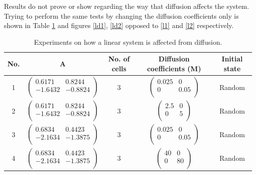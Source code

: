Results do not prove or show regarding the way that diffusion affects the system. Trying to perform the same tests by changing the diffusion coefficients only is shown in Table \ref{diffLexp} and figures \ref{ld1}, \ref{ld2} opposed to \ref{l1} and \ref{l2} respectively. 

\begin{table}
\caption{Experiments on how a linear system is affected from diffusion.}
\label{diffLexp} 
\begin{center}
\begin{tabular}{| c | c | c | c | c |}
\hline
No. & A & No. of cells & {Diffusion coefficients (M)} & Initial state\\ \hline
1 & $ \begin{pmatrix}
        0.6171 & 0.8244 \\
        -1.6432 & -0.8824 \\
\end{pmatrix} $ & 3 & 
$ \begin{pmatrix}
        0.025 & 0 \\
        0 & 0.05 \\
\end{pmatrix} $
 & Random \\ \hline


2 & $ \begin{pmatrix}
        0.6171 & 0.8244 \\
        -1.6432 & -0.8824 \\
\end{pmatrix} $ & 3 & 
$ \begin{pmatrix}
        2.5 & 0 \\
        0 & 5 \\
\end{pmatrix} $
 & Random \\ \hline


3 & $\begin{pmatrix}
        0.6834 & 0.4423 \\
        -2.1634 & -1.3875 \\
\end{pmatrix} $ & 3 & 
$ \begin{pmatrix}
        0.025 & 0 \\
        0 & 0.05 \\
\end{pmatrix} $ 
& Random \\ \hline


4 & $\begin{pmatrix}
        0.6834 & 0.4423 \\
        -2.1634 & -1.3875 \\
\end{pmatrix} $ & 3 & 
$ \begin{pmatrix}
        40 & 0 \\
        0 & 80 \\
\end{pmatrix} $ 
& Random \\ \hline
\end{tabular}
\end{center}
\end{table}



